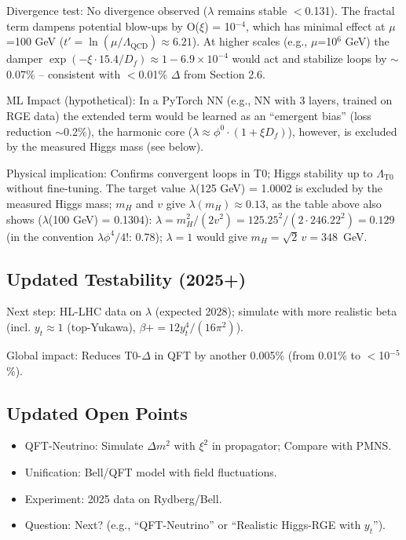 	Divergence test: No divergence observed ($\lambda$ remains stable $<$0.131). The fractal term dampens potential blow-ups by O($\xi$) = 10$^{-4}$, which has minimal effect at $\mu$=100 GeV ($t' = \ln(\mu/\Lambda_{\text{QCD}}) \approx 6.21$). At higher scales (e.g., $\mu$=10$^6$ GeV) the damper $\exp(-\xi \cdot 15.4 / D_f) \approx 1 - 6.9\times10^{-4}$ would act and stabilize loops by $\sim$0.07\% – consistent with $<$0.01\% $\Delta$ from Section 2.6.
	
	ML Impact (hypothetical): In a PyTorch NN (e.g., NN with 3 layers, trained on RGE data) the extended term would be learned as an ``emergent bias'' (loss reduction $\sim$0.2\%), the harmonic core ($\lambda \approx \phi^0 \cdot (1 + \xi D_f)$), however, is excluded by the measured Higgs mass (see below).
	
	Physical implication: Confirms convergent loops in T0; Higgs stability up to $\Lambda_{\text{T0}}$ without fine-tuning. The target value $\lambda$(125 GeV) = 1.0002 is excluded by the measured Higgs mass; $m_H$ and $v$ give $\lambda(m_H) \approx 0.13$, as the table above also shows ($\lambda$(100 GeV) = 0.1304): $\lambda = m_H^2/(2v^2) = 125.25^2/(2 \cdot 246.22^2) = 0.129$ (in the convention $\lambda\phi^4/4!$: 0.78); $\lambda = 1$ would give $m_H = \sqrt{2}\,v = 348$~GeV.
	
	\subsection{Updated Testability (2025+)}
	
	Next step: HL-LHC data on $\lambda$ (expected 2028); simulate with more realistic beta (incl. $y_t \approx 1$ (top-Yukawa), $\beta += 12 y_t^4 / (16\pi^2)$).
	
	Global impact: Reduces T0-$\Delta$ in QFT by another 0.005\% (from 0.01\% to $<$10$^{-5}$\%).
	
	\subsection{Updated Open Points}
	
	\begin{itemize}
		\item QFT-Neutrino: Simulate $\Delta m^2$ with $\xi^2$ in propagator; Compare with PMNS.
		\item Unification: Bell/QFT model with field fluctuations.
		\item Experiment: 2025 data on Rydberg/Bell.
		\item Question: Next? (e.g., ``QFT-Neutrino'' or ``Realistic Higgs-RGE with $y_t$'').
	\end{itemize}
	
